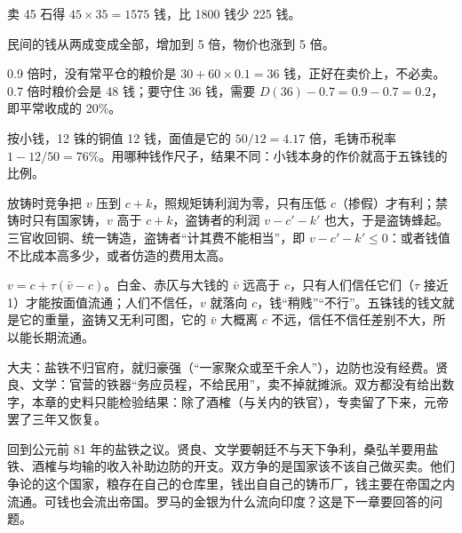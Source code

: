 \begin{answers}
\item 卖 45 石得 $45\times35=1575$ 钱，比 1800 钱少 225 钱。
\item 民间的钱从两成变成全部，增加到 5 倍，物价也涨到 5 倍。
\item 0.9 倍时，没有常平仓的粮价是 $30+60\times0.1=36$ 钱，正好在卖价上，不必卖。0.7 倍时粮价会是 48 钱；要守住 36 钱，需要 $D(36)-0.7=0.9-0.7=0.2$，即平常收成的 20\%。
\item 按小钱，12 铢的铜值 12 钱，面值是它的 $50/12=4.17$ 倍，毛铸币税率 $1-12/50=76\%$。用哪种钱作尺子，结果不同：小钱本身的作价就高于五铢钱的比例。
\item 放铸时竞争把 $v$ 压到 $c+k$，照规矩铸利润为零，只有压低 $c$（掺假）才有利；禁铸时只有国家铸，$v$ 高于 $c+k$，盗铸者的利润 $v-c'-k'$ 也大，于是盗铸蜂起。三官收回铜、统一铸造，盗铸者“计其费不能相当”，即 $v-c'-k'\le0$：或者钱值不比成本高多少，或者仿造的费用太高。
\item $v=c+\tau(\bar v-c)$。白金、赤仄与大钱的 $\bar v$ 远高于 $c$，只有人们信任它们（$\tau$ 接近 1）才能按面值流通；人们不信任，$v$ 就落向 $c$，钱“稍贱”“不行”。五铢钱的钱文就是它的重量，盗铸又无利可图，它的 $\bar v$ 大概离 $c$ 不远，信任不信任差别不大，所以能长期流通。
\item 大夫：盐铁不归官府，就归豪强（“一家聚众或至千余人”），边防也没有经费。贤良、文学：官营的铁器“务应员程，不给民用”，卖不掉就摊派。双方都没有给出数字，本章的史料只能检验结果：除了酒榷（与关内的铁官），专卖留了下来，元帝罢了三年又恢复。
\end{answers}

回到公元前 81 年的盐铁之议。贤良、文学要朝廷不与天下争利，桑弘羊要用盐铁、酒榷与均输的收入补助边防的开支。双方争的是国家该不该自己做买卖。他们争论的这个国家，粮存在自己的仓库里，钱出自自己的铸币厂，钱主要在帝国之内流通。可钱也会流出帝国。罗马的金银为什么流向印度？这是下一章要回答的问题。
